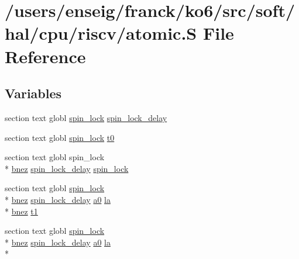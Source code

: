 \hypertarget{riscv_2atomic_8S}{\section{/users/enseig/franck/ko6/src/soft/hal/cpu/riscv/atomic.S File Reference}
\label{riscv_2atomic_8S}
}
\subsection*{Variables}
\begin{DoxyCompactItemize}
\item 
section text globl \hyperlink{atomic_8h_a92a25e1136e165cc5472d68e3901e364}{spin\-\_\-lock} \hyperlink{riscv_2atomic_8S_ac58f8c5ceac726ecc3bcc7f0360b5cfa}{spin\-\_\-lock\-\_\-delay}
\item 
section text globl \hyperlink{atomic_8h_a92a25e1136e165cc5472d68e3901e364}{spin\-\_\-lock} \hyperlink{riscv_2atomic_8S_ae9747d0e53eec3077df6659993460c34}{t0}
\item 
section text globl spin\-\_\-lock \\*
\hyperlink{mips_2atomic_8S_ac90faece1c7b2fe2dcf10741e4322281}{bnez} \hyperlink{riscv_2atomic_8S_ac58f8c5ceac726ecc3bcc7f0360b5cfa}{spin\-\_\-lock\-\_\-delay} \hyperlink{riscv_2atomic_8S_a3e45f57ebbb323b69fb4d0b22eae8497}{spin\-\_\-lock}
\item 
section text globl \hyperlink{atomic_8h_a92a25e1136e165cc5472d68e3901e364}{spin\-\_\-lock} \\*
\hyperlink{mips_2atomic_8S_ac90faece1c7b2fe2dcf10741e4322281}{bnez} \hyperlink{riscv_2atomic_8S_ac58f8c5ceac726ecc3bcc7f0360b5cfa}{spin\-\_\-lock\-\_\-delay} \hyperlink{riscv_2threada_8S_aaef62817c8f68f920ec8214f18b86a4c}{a0} \hyperlink{mips_2kpanica_8S_a2fb13edcab8f873099119dfe01c49d47}{la} \\*
\hyperlink{mips_2atomic_8S_ac90faece1c7b2fe2dcf10741e4322281}{bnez} \hyperlink{riscv_2atomic_8S_ae7a3f7baeb6769a5ca90b5626bf66259}{t1}
\item 
section text globl \hyperlink{atomic_8h_a92a25e1136e165cc5472d68e3901e364}{spin\-\_\-lock} \\*
\hyperlink{mips_2atomic_8S_ac90faece1c7b2fe2dcf10741e4322281}{bnez} \hyperlink{riscv_2atomic_8S_ac58f8c5ceac726ecc3bcc7f0360b5cfa}{spin\-\_\-lock\-\_\-delay} \hyperlink{riscv_2threada_8S_aaef62817c8f68f920ec8214f18b86a4c}{a0} \hyperlink{mips_2kpanica_8S_a2fb13edcab8f873099119dfe01c49d47}{la} \\*

\end{DoxyCompactItemize}
